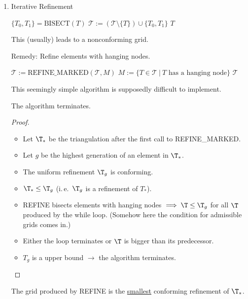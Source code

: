 \begin{enumerate}[label = \alph*)]
	\item Iterative Refinement
    \begin{algorithmic}[0]
        \State $\{T_0, T_1\} = \text{BISECT} (T)$
          \State $\mathcal{T} := (\mathcal{T} \setminus \{T\}) \cup \{T_0, T_1\}$
        \EndFor
        \State \Return $T$
      \EndFunction
    \end{algorithmic}
    This (usually) leads to a nonconforming grid.

		Remedy: Refine elements with hanging nodes.
    \begin{algorithmic}[0]
          \State $\mathcal{T} := \text{REFINE\_MARKED}(\mathcal{T}, M)$
          \State $M := \{T \in \mathcal{T} \ |\ T \text{ has a hanging node}\}$
        \EndWhile
        \State \Return $\mathcal{T}$
      \EndFunction
    \end{algorithmic}
    This seemingly simple algorithm is supposedly difficult to implement.
		\begin{lemma}
			The algorithm terminates.
    \end{lemma}
    \begin{proof}\
			\begin{itemize}
				\item Let $\T_{*}$ be the triangulation after the first call to REFINE\_MARKED.
				\item Let $g$ be the highest generation of an element in $\T_{*}$. 
				\item The uniform refinement $\T_{g}$ is conforming.
				\item $\T_{*}\leq \T_{g}$ (i.\,e.\ $\T_{g}$ is a refinement of $T_{*}$).
        \item REFINE bisects elements with hanging nodes $\implies \T \leq \T_{g}$ for all $\T$ produced by the \glqq while\grqq{} loop. (Somehow here the condition for admissible grids comes in.)
				\item Either the loop terminates or $\T$ is bigger than its predecessor.
				\item $T_{g}$ is a upper bound $\to$ the algorithm terminates.
			\end{itemize}
		\end{proof}
		\begin{lemma}
			The grid produced by REFINE
			is the \underline{smallest} conforming refinement of $\T_{*}$.
		\end{lemma}

\end{enumerate}
